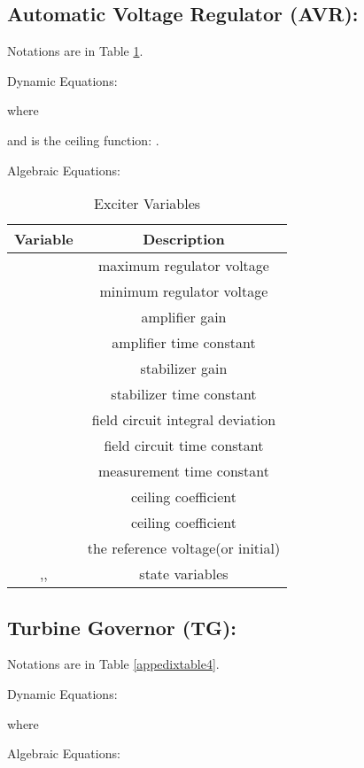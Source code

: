 \documentclass[journal]{IEEEtran}
\begin{document}
\subsection{Automatic Voltage Regulator (AVR):}
Notations are in Table \ref{appedixtable2}.

Dynamic Equations:

where


and  is the ceiling function: .

Algebraic Equations:



\begin{table}[h]
\centering
\caption{Exciter Variables}\label{appedixtable2}
\begin{tabular}{|c|c|}
\hline
Variable&Description\\
\hline
&maximum regulator voltage\\
\hline
&minimum regulator voltage\\
\hline
&amplifier gain\\
\hline
&amplifier time constant\\
\hline
&stabilizer gain\\
\hline
&stabilizer time constant\\
\hline
&field circuit integral deviation\\
\hline
&field circuit time constant\\
\hline
&measurement time constant\\
\hline
& ceiling coefficient\\
\hline
& ceiling coefficient\\
\hline
&the reference voltage(or initial)\\
\hline
,,&state variables\\
\hline
\end{tabular}
\end{table}

\subsection{Turbine Governor (TG):}
Notations are in Table \ref{appedixtable4}.

Dynamic Equations:


where


Algebraic Equations:
\end{document}
